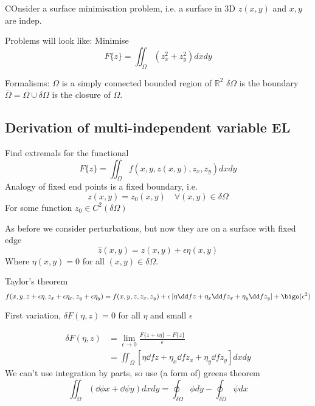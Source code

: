 \documentclass{X:/Documents/Coding/Latex/myassignment}
\begin{document}
COnsider a surface minimisation problem, i.e. a surface in 3D $z(x,y)$ and $x,y$ are indep. 

Problems will look like:
Minimise
\[F\{z\} = \iint_{\Omega} (z_x^2 + z_y^2) dxdy\]


Formalisms:
$\Omega$ is a simply connected bounded region of $\mathbb{R}^2$
$\delta \Omega$ is the boundary
$\bar{\Omega} = \Omega \cup \delta \Omega$ is the closure of $\Omega$.
\[\]
\[\]
\[\]



\subsection{Derivation of multi-independent variable EL}
Find extremals for the functional
\[F\{z\} = \iint_{\Omega} f(x,y,z(x,y),z_x,z_y) dxdy\]
Analogy of fixed end points is a fixed boundary, i.e.
\[z(x,y) = z_0(x,y) \quad \forall (x,y) \in \delta \Omega\]
For some function $z_0 \in C^2(\delta \Omega)$

As before we consider perturbations, but now they are on a surface with fixed edge
\[\hat{z}(x,y) = z(x,y) + \epsilon \eta(x,y)\]
Where $\eta(x,y) = 0$ for all $(x,y) \in \delta \Omega$.


Taylor's theorem
\[f(x,y,z+\epsilon \eta, z_x + \epsilon \eta_x, z_y + \epsilon \eta_y) = f(x,y,z,z_x,z_y) + \epsilon \left[ \eta \dd fz + \eta_x \dd f{z_x} + \eta_y \dd f{z_y} \right] + \bigo(\epsilon^2)\]

First variation, $\delta F(\eta,z) = 0$ for all $\eta$ and small $\epsilon$

\begin{align*}
	\delta F(\eta,z) &= \lim_{\epsilon \to 0} \frac{F\{z + \epsilon \eta\} - F\{z\}}{\epsilon}\\
	&= \iint_{\Omega} \left[\eta \dd fz + \eta_x \dd f{z_x} + \eta_y \dd f{z_y}\right] dxdy
\end{align*}
We can't use integration by parts, so use (a form of) greens theorem
\[\iint_{\Omega} \left(\dd\phi x + \dd\psi y\right) dxdy = \oint_{\delta \Omega} \phi dy - \oint_{\delta \Omega} \psi dx\]
\end{document}

